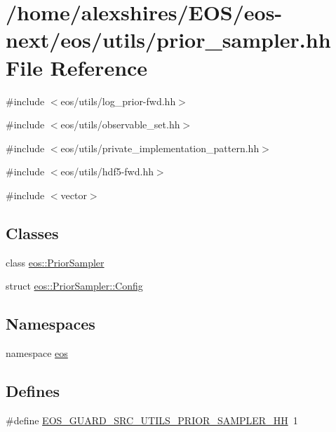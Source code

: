 \hypertarget{prior__sampler_8hh}{
\section{/home/alexshires/EOS/eos-\/next/eos/utils/prior\_\-sampler.hh File Reference}
\label{prior__sampler_8hh}
}
{\ttfamily \#include $<$eos/utils/log\_\-prior-\/fwd.hh$>$}\par
{\ttfamily \#include $<$eos/utils/observable\_\-set.hh$>$}\par
{\ttfamily \#include $<$eos/utils/private\_\-implementation\_\-pattern.hh$>$}\par
{\ttfamily \#include $<$eos/utils/hdf5-\/fwd.hh$>$}\par
{\ttfamily \#include $<$vector$>$}\par
\subsection*{Classes}
\begin{DoxyCompactItemize}
\item 
class \hyperlink{classeos_1_1PriorSampler}{eos::PriorSampler}
\item 
struct \hyperlink{structeos_1_1PriorSampler_1_1Config}{eos::PriorSampler::Config}
\end{DoxyCompactItemize}
\subsection*{Namespaces}
\begin{DoxyCompactItemize}
\item 
namespace \hyperlink{namespaceeos}{eos}
\end{DoxyCompactItemize}
\subsection*{Defines}
\begin{DoxyCompactItemize}
\item 
\#define \hyperlink{prior__sampler_8hh_a4e897fbdc7ba64f124d5578a4bf894c9}{EOS\_\-GUARD\_\-SRC\_\-UTILS\_\-PRIOR\_\-SAMPLER\_\-HH}~1
\end{DoxyCompactItemize}


